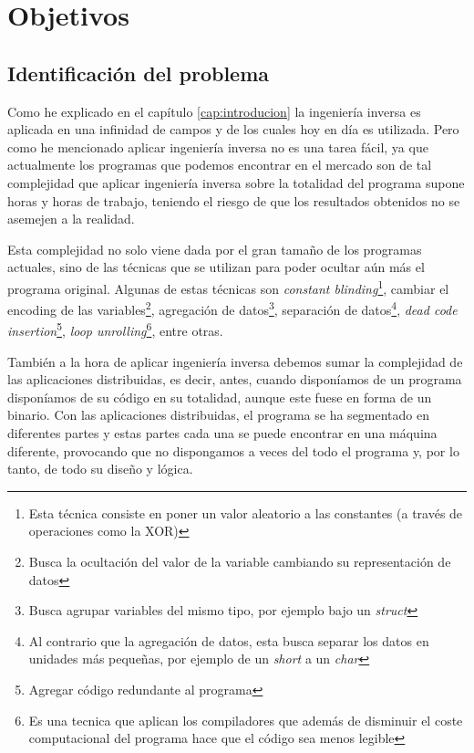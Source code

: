 \chapter{Objetivos}
\label{cap:objetivos}



\section{Identificación del problema}
\label{sec:problema}


Como he explicado en el capítulo \ref{cap:introducion} la ingeniería inversa es aplicada en una infinidad de campos y de los cuales hoy en día es utilizada. Pero como he mencionado
aplicar ingeniería inversa no es una tarea fácil, ya que actualmente los programas que podemos encontrar en el mercado son de tal complejidad que aplicar ingeniería inversa sobre la
totalidad del programa supone horas y horas de trabajo, teniendo el riesgo de que los resultados obtenidos no se asemejen a la realidad.

Esta complejidad no solo viene dada por el gran tamaño de los programas actuales, sino de las técnicas que se utilizan para poder ocultar aún más el programa original. Algunas
de estas técnicas son \textit{constant blinding}\footnote{Esta técnica consiste en poner un valor aleatorio a las constantes (a través de operaciones como la XOR)}, cambiar el
encoding de las variables\footnote{Busca la ocultación del valor de la variable cambiando su representación de datos}, agregación de datos\footnote{Busca agrupar variables del mismo
tipo, por ejemplo bajo un \textit{struct}}, separación de datos\footnote{Al contrario que la agregación de datos, esta busca separar los datos en unidades más pequeñas, por ejemplo
de un \textit{short} a un \textit{char}}, \textit{dead code insertion}\footnote{Agregar código redundante al programa}, \textit{loop unrolling}\footnote{Es una tecnica que aplican
los compiladores que además de disminuir el coste computacional del programa hace que el código sea menos legible}, entre otras. \cite{TecnicasIlegibleBinario}

También a la hora de aplicar ingeniería inversa debemos sumar la complejidad de las aplicaciones distribuidas, es decir, antes, cuando disponíamos de un programa disponíamos de su
código en su totalidad, aunque este fuese en forma de un binario. Con las aplicaciones distribuidas, el programa se ha segmentado en diferentes partes y estas partes cada una se
puede encontrar en una máquina diferente, provocando que no dispongamos a veces del todo el programa y, por lo tanto, de todo su diseño y lógica.

